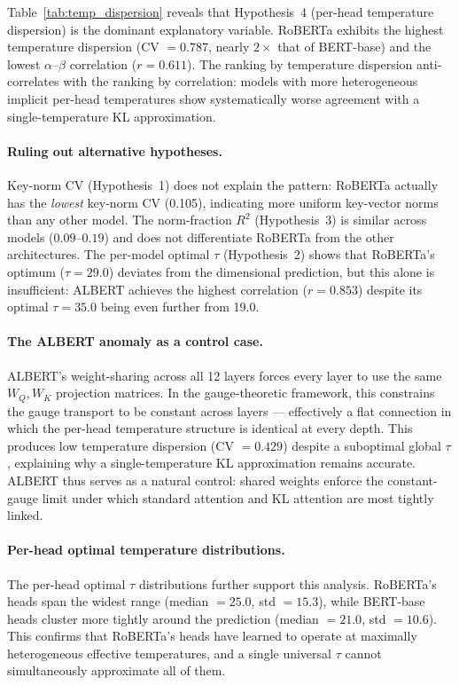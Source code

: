 \documentclass[twoside,11pt]{article}
\begin{document}
Table~\ref{tab:temp_dispersion} reveals that Hypothesis~4 (per-head temperature dispersion) is the dominant explanatory variable. RoBERTa exhibits the highest temperature dispersion (CV $= 0.787$, nearly $2\times$ that of BERT-base) and the lowest $\alpha$--$\beta$ correlation ($r = 0.611$). The ranking by temperature dispersion anti-correlates with the ranking by correlation: models with more heterogeneous implicit per-head temperatures show systematically worse agreement with a single-temperature KL approximation.

\paragraph{Ruling out alternative hypotheses.}
Key-norm CV (Hypothesis~1) does not explain the pattern: RoBERTa actually has the \emph{lowest} key-norm CV (0.105), indicating more uniform key-vector norms than any other model. The norm-fraction $R^2$ (Hypothesis~3) is similar across models ($0.09$--$0.19$) and does not differentiate RoBERTa from the other architectures. The per-model optimal $\tau$ (Hypothesis~2) shows that RoBERTa's optimum ($\tau = 29.0$) deviates from the dimensional prediction, but this alone is insufficient: ALBERT achieves the highest correlation ($r = 0.853$) despite its optimal $\tau = 35.0$ being even further from 19.0.

\paragraph{The ALBERT anomaly as a control case.}
ALBERT's weight-sharing across all 12 layers forces every layer to use the same $W_Q, W_K$ projection matrices. In the gauge-theoretic framework, this constrains the gauge transport to be constant across layers --- effectively a flat connection in which the per-head temperature structure is identical at every depth. This produces low temperature dispersion (CV $= 0.429$) despite a suboptimal global $\tau$, explaining why a single-temperature KL approximation remains accurate. ALBERT thus serves as a natural control: shared weights enforce the constant-gauge limit under which standard attention and KL attention are most tightly linked.

\paragraph{Per-head optimal temperature distributions.}
The per-head optimal $\tau$ distributions further support this analysis. RoBERTa's heads span the widest range (median $= 25.0$, std $= 15.3$), while BERT-base heads cluster more tightly around the prediction (median $= 21.0$, std $= 10.6$). This confirms that RoBERTa's heads have learned to operate at maximally heterogeneous effective temperatures, and a single universal $\tau$ cannot simultaneously approximate all of them.
\end{document}
